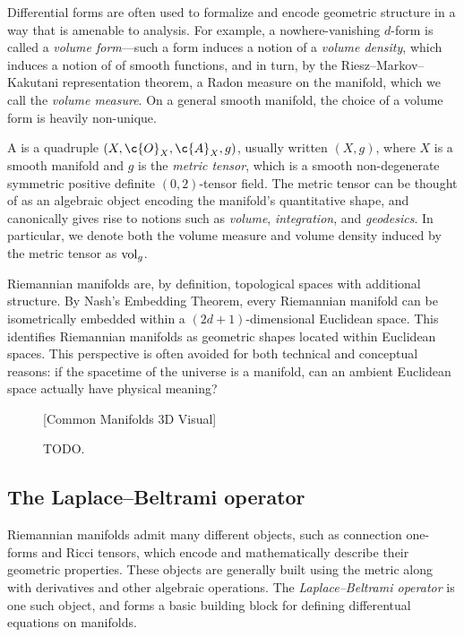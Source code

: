 \documentclass[11pt]{book}
\begin{document}
Differential forms are often used to formalize and encode geometric structure in a way that is amenable to analysis.
For example, a nowhere-vanishing $d$-form is called a \emph{volume form}---such a form induces a notion of a \emph{volume density}, which induces a notion of  of smooth functions, and in turn, by the Riesz--Markov--Kakutani representation theorem, a Radon measure on the manifold, which we call the \emph{volume measure}.
On a general smooth manifold, the choice of a volume form is heavily non-unique.

A  is a quadruple $(X,\c{O}_X,\c{A}_X,g)$, usually written $(X,g)$, where $X$ is a smooth manifold and $g$ is the \emph{metric tensor}, which is a smooth non-degenerate symmetric positive definite $(0,2)$-tensor field.
The metric tensor can be thought of as an algebraic object encoding the manifold's quantitative shape, and canonically gives rise to notions such as \emph{volume}, \emph{integration}, and \emph{geodesics}.
In particular, we denote both the volume measure and volume density induced by the metric tensor as $\operatorname{vol}_g$.

Riemannian manifolds are, by definition, topological spaces with additional structure.
By Nash's Embedding Theorem, every Riemannian manifold can be isometrically embedded within a $(2d+1)$-dimensional Euclidean space.
This identifies Riemannian manifolds as geometric shapes located within Euclidean spaces.
This perspective is often avoided for both technical and conceptual reasons: if the spacetime of the universe is a manifold, can an ambient Euclidean space actually have physical meaning?

\begin{figure}
\vspace*{10ex}
[Common Manifolds 3D Visual]
\vspace*{10ex}
\caption{TODO.}
\end{figure}

\subsection{The Laplace--Beltrami operator}

Riemannian manifolds admit many different objects, such as connection one-forms and Ricci tensors, which encode and mathematically describe their geometric properties.
These objects are generally built using the metric along with derivatives and other algebraic operations.
The \emph{Laplace--Beltrami operator} is one such object, and forms a basic building block for defining differentual equations on manifolds.
\end{document}
